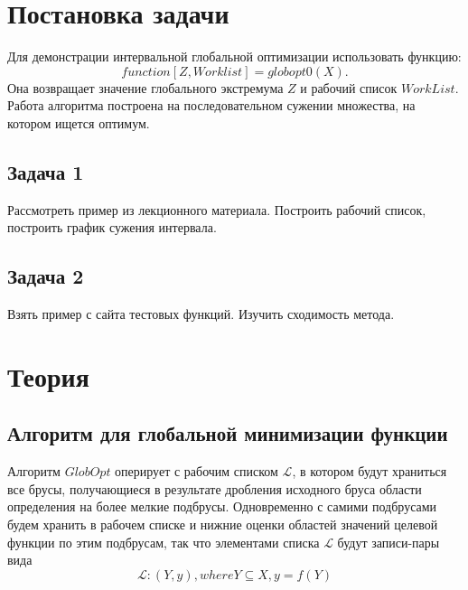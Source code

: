
\usepackage{amsmath}

\lstset{language=Java} 




\renewcommand\contentsname{\centerline{Содержание}}
\tableofcontents
\newpage


\section{Постановка задачи}

Для демонстрации интервальной глобальной оптимизации использовать функцию:
\begin{equation}
	function [Z, Worklist] = globopt0(X).
\end{equation}
Она возвращает значение глобального экстремума $Z$ и рабочий список $WorkList$. Работа алгоритма построена на последовательном сужении множества, на котором ищется оптимум.

\subsection{Задача 1}

Рассмотреть пример из лекционного материала. Построить рабочий список, построить график сужения интервала.

\subsection{Задача 2}

Взять пример с сайта тестовых функций. Изучить сходимость метода.



\section{Теория}

\subsection{Алгоритм для глобальной минимизации функции}

Алгоритм $GlobOpt$ оперирует с рабочим списком $\mathcal{L}$, в котором будут храниться все брусы, получающиеся в результате дробления исходного бруса области определения на более мелкие подбрусы. Одновременно с самими подбрусами будем хранить в рабочем списке и нижние оценки областей значений целевой функции по этим подбрусам, так что элементами списка $\mathcal{L}$ будут записи-пары вида
\begin{equation}
	\mathcal{L}: (Y, y), where Y \subseteq X, y = f(Y)
\end{equation}

